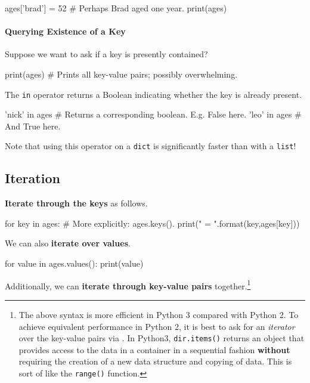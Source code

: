 \documentclass[12pt,letterpaper,twoside]{article}
\begin{document}
\begin{python}
ages['brad'] = 52   # Perhaps Brad aged one year.
print(ages)
\end{python}

\vspace{-12pt}
\paragraph{Querying Existence of a Key}

Suppose we want to ask if a key is presently contained?
\begin{python}
print(ages)  # Prints all key-value pairs; possibly overwhelming.
\end{python}

The \texttt{in} operator returns a Boolean indicating whether the key is already present.

\begin{python}
'nick' in ages  # Returns a corresponding boolean. E.g. False here.
'leo'  in ages  # And True here.
\end{python}

Note that using this operator on a \texttt{dict} is significantly faster than with a \texttt{list}!

\vspace{-12pt}
\subsection{Iteration}
\textbf{Iterate through the keys} as follows.

\begin{python}
for key in ages:                            # More explicitly: ages.keys().
    print("{} = {}".format(key,ages[key]))
\end{python}

We can also \textbf{iterate over values}.

\begin{python}
for value in ages.values():
    print(value)
\end{python}

Additionally, we can \textbf{iterate through key-value pairs} together.\footnote{
The above syntax is more efficient in Python 3 compared
with Python 2. To achieve equivalent performance in Python 2, it is best
to ask for an \emph{iterator} over the key-value pairs via .
In Python3, \texttt{dir.items()} returns an object that provides access to the data in a container
in a sequential fashion \textbf{without} requiring the creation of a new
data structure and copying of data. This is sort of like the
\texttt{range()} function.}
\end{document}
